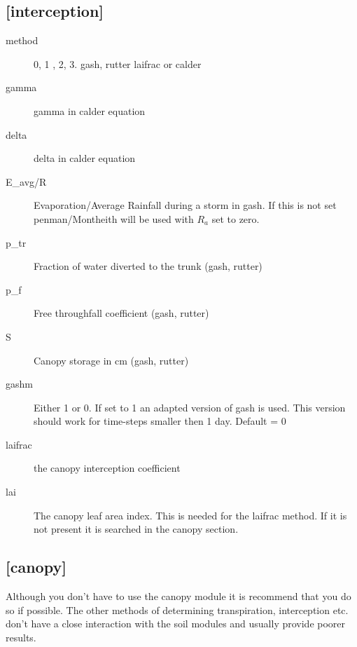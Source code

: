 \subsection{[interception]}\label{section:interception}
\begin{description}
\item[method]
0, 1 , 2, 3.
gash, rutter laifrac or calder

\item[gamma]
gamma in calder equation

\item[delta]
delta in calder equation

\item[E\_avg/R]
Evaporation/Average Rainfall during a storm   in gash. If this is  not
set penman/Montheith will be used with $R_a$ set to zero.

\item[p\_tr]
Fraction of water diverted to the trunk (gash, rutter)

\item[p\_f]
Free throughfall coefficient (gash, rutter)

\item[S]
Canopy storage in cm (gash, rutter)

\item[gashm]
Either 1 or 0. If set to 1 an adapted version of gash is used. This
version should work for time-steps smaller then 1 day. Default = 0

\item[laifrac]
the canopy interception coefficient

\item[lai]
The canopy leaf area index. This is needed for the laifrac method. If
it is not present it is searched in the canopy section.
\end{description}


\subsection{[canopy]}\label{section:canopy}

Although you don't have to use the canopy module it is recommend that
you do so if possible. The other methods of determining transpiration,
interception etc. don't have a close interaction with the soil modules
and usually provide poorer results.


